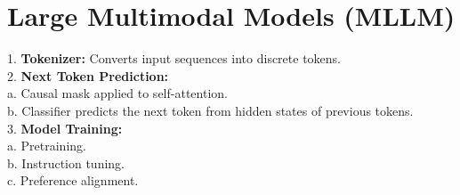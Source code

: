 \section{Large Multimodal Models (MLLM)}
1. \textbf{Tokenizer:} Converts input sequences into discrete tokens. \\
2. \textbf{Next Token Prediction:} \\
   a. Causal mask applied to self-attention. \\
   b. Classifier predicts the next token from hidden states of previous tokens. \\
3. \textbf{Model Training:} \\
   a. Pretraining. \\
   b. Instruction tuning. \\
   c. Preference alignment. \\
